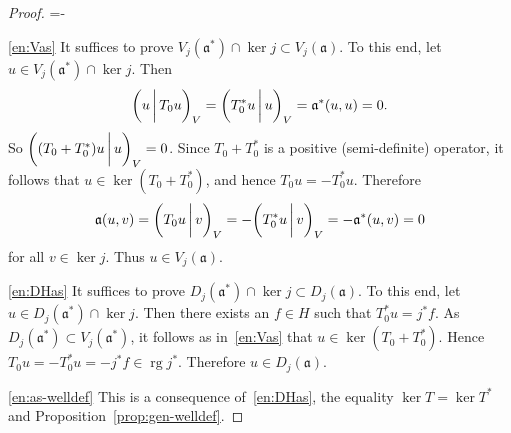 \documentclass[a4paper,oneside,12pt]{amsart}
\makeatletter
\theoremstyle{plain}
\theoremstyle{definition}
\newenvironment{parenum}[1][]{\my@savedparindent=\parindent\ifthenelse{\equal{#1}{}}{\asparaenum}{\asparaenum[#1]}\advance\itemindent-\my@savedparindent
\patchcmd{\@item}{\ignorespaces}{{\itemindent={\the\itemindent}
\def{}}\ignorespaces}{}{}}
{\endasparaenum}
\makeatother
\begin{document}
\begin{proof}
\begin{parenum}
\item[\ref{en:Vas}]
It suffices to prove $V_j({{\mathfrak{{a}}}}^*)\cap\ker j\subset V_j({{\mathfrak{{a}}}})$.
To this end, let $u\in V_j({{\mathfrak{{a}}}}^*)\cap\ker j$. 
Then
\[
	{{\ifthenelse{\equal{auto}{auto}}{\left({u}\mkern3mu{\biggm|}\mkern3mu {T_0u}\right)}{}
\ifthenelse{\equal{auto}{b}}{\bigl({u}\mkern3mu{\biggm|}\mkern3mu {T_0u}\bigr)}{}
\ifthenelse{\equal{auto}{B}}{\Bigl({u}\mkern3mu{\bigm|}\mkern3mu {T_0u}\Bigr)}{}
}}_V = {{\ifthenelse{\equal{auto}{auto}}{\left({T_0^*u}\mkern3mu{\biggm|}\mkern3mu {u}\right)}{}
\ifthenelse{\equal{auto}{b}}{\bigl({T_0^*u}\mkern3mu{\biggm|}\mkern3mu {u}\bigr)}{}
\ifthenelse{\equal{auto}{B}}{\Bigl({T_0^*u}\mkern3mu{\bigm|}\mkern3mu {u}\Bigr)}{}
}}_V = {{\mathfrak{{a}}}}^*(u,u)=0.
\]
So ${{\ifthenelse{\equal{auto}{auto}}{\left({(T_0+T_0^*)u}\mkern3mu{\biggm|}\mkern3mu {u}\right)}{}
\ifthenelse{\equal{auto}{b}}{\bigl({(T_0+T_0^*)u}\mkern3mu{\biggm|}\mkern3mu {u}\bigr)}{}
\ifthenelse{\equal{auto}{B}}{\Bigl({(T_0+T_0^*)u}\mkern3mu{\bigm|}\mkern3mu {u}\Bigr)}{}
}}_V=0$. Since $T_0+T_0^*$ is a positive (semi-definite) operator,
it follows that $u\in\ker (T_0+T_0^*)$, and hence $T_0 u = -T_0^*u$.
Therefore
\[
	{{\mathfrak{{a}}}}(u,v)={{\ifthenelse{\equal{auto}{auto}}{\left({T_0u}\mkern3mu{\biggm|}\mkern3mu {v}\right)}{}
\ifthenelse{\equal{auto}{b}}{\bigl({T_0u}\mkern3mu{\biggm|}\mkern3mu {v}\bigr)}{}
\ifthenelse{\equal{auto}{B}}{\Bigl({T_0u}\mkern3mu{\bigm|}\mkern3mu {v}\Bigr)}{}
}}_V=-{{\ifthenelse{\equal{auto}{auto}}{\left({T_0^*u}\mkern3mu{\biggm|}\mkern3mu {v}\right)}{}
\ifthenelse{\equal{auto}{b}}{\bigl({T_0^*u}\mkern3mu{\biggm|}\mkern3mu {v}\bigr)}{}
\ifthenelse{\equal{auto}{B}}{\Bigl({T_0^*u}\mkern3mu{\bigm|}\mkern3mu {v}\Bigr)}{}
}}_V=-{{\mathfrak{{a}}}}^*(u,v)=0
\]
for all $v\in\ker j$. Thus $u\in V_j({{\mathfrak{{a}}}})$.

\item[\ref{en:DHas}]
It suffices to prove $D_j({{\mathfrak{{a}}}}^*)\cap\ker j\subset D_j({{\mathfrak{{a}}}})$.
To this end, let $u\in D_j({{\mathfrak{{a}}}}^*)\cap\ker j$. Then there exists an $f\in H$ such that $T_0^*u=j^*f$.
As $D_j({{\mathfrak{{a}}}}^*)\subset V_j({{\mathfrak{{a}}}}^*)$, it follows as in~\ref{en:Vas} that $u\in\ker (T_0+T_0^*)$.
Hence $T_0u=-T_0^*u= -j^*f\in\operatorname{rg} j^*$.
Therefore $u\in D_j({{\mathfrak{{a}}}})$.

\item[\ref{en:as-welldef}]
This is a consequence of~\ref{en:DHas}, 
the equality $\ker T=\ker T^*$ and
Proposition~\ref{prop:gen-welldef}.
\qedhere
\end{parenum}
\end{proof}
\end{document}
